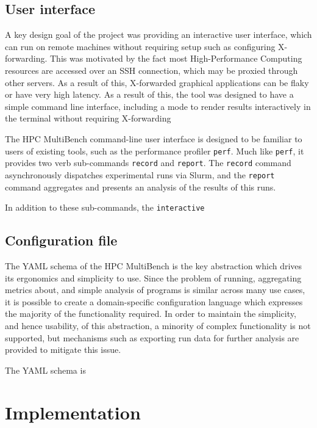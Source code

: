 \subsection{User interface}
\label{sec:hpc-multibench-ui}
A key design goal of the project was providing an interactive user interface, which can run on remote machines without requiring setup such as configuring X-forwarding. This was motivated by the fact most High-Performance Computing resources are accessed over an SSH connection, which may be proxied through other servers. As a result of this, X-forwarded graphical applications can be flaky or have very high latency. As a result of this, the tool was designed to have a simple command line interface, including a mode to render results interactively in the terminal without requiring X-forwarding

The HPC MultiBench command-line user interface is designed to be familiar to users of existing tools, such as the performance profiler \texttt{perf}. Much like \texttt{perf}, it provides two verb sub-commands \texttt{record} and \texttt{report}. The \texttt{record} command asynchronously dispatches experimental runs via Slurm, and the \texttt{report} command aggregates and presents an analysis of the results of this runs.

In addition to these sub-commands, the \texttt{interactive}


\subsection{Configuration file}
\label{sec:hpc-multibench-configuration-design}
The YAML schema of the HPC MultiBench is the key abstraction which drives its ergonomics and simplicity to use. Since the problem of running, aggregating metrics about, and simple analysis of programs is similar across many use cases, it is possible to create a domain-specific configuration language which expresses the majority of the functionality required. In order to maintain the simplicity, and hence usability, of this abstraction, a minority of complex functionality is not supported, but mechanisms such as exporting run data for further analysis are provided to mitigate this issue.

The YAML schema is 


\section{Implementation}
\label{sec:hpc-multibench-implementation} %

